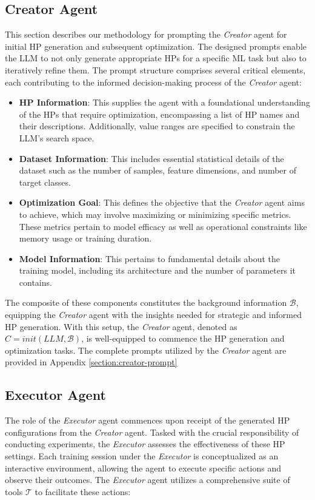 \documentclass{article}
\begin{document}
\subsection{Creator Agent}

This section describes our methodology for prompting the \textit{Creator} agent for initial HP generation and subsequent optimization. The designed prompts enable the LLM to not only generate appropriate HPs for a specific ML task but also to iteratively refine them. The prompt structure comprises several critical elements, each contributing to the informed decision-making process of the \textit{Creator} agent:

\begin{itemize}[leftmargin=*]
\item \textbf{HP Information}: This supplies the agent with a foundational understanding of the HPs that require optimization, encompassing a list of HP names and their descriptions. Additionally, value ranges are specified to constrain the LLM's search space.
\item \textbf{Dataset Information}: This includes essential statistical details of the dataset such as the number of samples, feature dimensions, and number of target classes.
\item \textbf{Optimization Goal}: This defines the objective that the \textit{Creator} agent aims to achieve, which may involve maximizing or minimizing specific metrics. These metrics pertain to model efficacy as well as operational constraints like memory usage or training duration.
\item \textbf{Model Information}: This pertains to fundamental details about the training model, including its architecture and the number of parameters it contains.
\end{itemize}

The composite of these components constitutes the background information \( \mathcal{B} \), equipping the \textit{Creator} agent with the insights needed for strategic and informed HP generation. With this setup, the \textit{Creator} agent, denoted as $C = init(LLM, \mathcal{B})$, is well-equipped to commence the HP generation and optimization tasks. The complete prompts utilized by the \textit{Creator} agent are provided in Appendix \ref{section:creator-prompt}


\subsection{Executor Agent}
The role of the \textit{Executor} agent commences upon receipt of the generated HP configurations from the \textit{Creator} agent. Tasked with the crucial responsibility of conducting experiments, the \textit{Executor} assesses the effectiveness of these HP settings. Each training session under the \textit{Executor} is conceptualized as an interactive environment, allowing the agent to execute specific actions and observe their outcomes. The \textit{Executor} agent utilizes a comprehensive suite of tools $\mathcal{T}$ to facilitate these actions:
\end{document}
